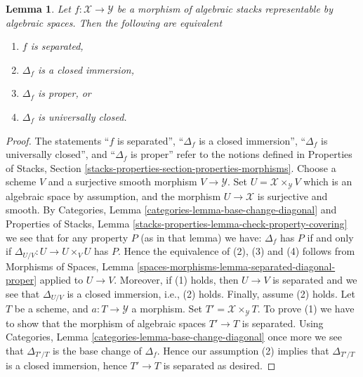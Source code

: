 \documentclass[10pt,a4paper]{amsart}
\theoremstyle{plain}
\newtheorem{lemma}[subsection]{Lemma}
\theoremstyle{definition}
\theoremstyle{remark}
\numberwithin{equation}{subsection}
\begin{document}
\begin{lemma}
\label{lemma-representable-separated-diagonal-closed}
Let $f : \mathcal{X} \to \mathcal{Y}$ be a morphism of algebraic stacks
representable by algebraic spaces. Then the following are equivalent
\begin{enumerate}
\item $f$ is separated,
\item $\Delta_f$ is a closed immersion,
\item $\Delta_f$ is proper, or
\item $\Delta_f$ is universally closed.
\end{enumerate}
\end{lemma}

\begin{proof}
The statements
``$f$ is separated'',
``$\Delta_f$ is a closed immersion'',
``$\Delta_f$ is universally closed'', and
``$\Delta_f$ is proper''
refer to the notions defined in
Properties of Stacks,
Section \ref{stacks-properties-section-properties-morphisms}.
Choose a scheme $V$ and a surjective smooth morphism $V \to \mathcal{Y}$.
Set $U = \mathcal{X} \times_\mathcal{Y} V$ which is an algebraic
space by assumption, and the morphism $U \to \mathcal{X}$ is surjective
and smooth. By
Categories, Lemma \ref{categories-lemma-base-change-diagonal}
and
Properties of Stacks,
Lemma \ref{stacks-properties-lemma-check-property-covering}
we see that for any property $P$ (as in that lemma) we have:
$\Delta_f$ has $P$ if and only if $\Delta_{U/V} : U \to  U \times_V U$ has $P$.
Hence the equivalence of (2), (3) and (4) follows from
Morphisms of Spaces,
Lemma \ref{spaces-morphisms-lemma-separated-diagonal-proper}
applied to $U \to V$.
Moreover, if (1) holds, then $U \to V$ is separated and we see that
$\Delta_{U/V}$ is a closed immersion, i.e., (2) holds.
Finally, assume (2) holds. Let $T$ be a scheme, and $a : T \to \mathcal{Y}$
a morphism. Set $T' = \mathcal{X} \times_\mathcal{Y} T$. To prove
(1) we have to show that the morphism of algebraic spaces $T' \to T$
is separated. Using
Categories, Lemma \ref{categories-lemma-base-change-diagonal}
once more we see that $\Delta_{T'/T}$ is the base change of
$\Delta_f$. Hence our assumption (2) implies that $\Delta_{T'/T}$
is a closed immersion, hence $T' \to T$ is separated as desired.
\end{proof}
\end{document}
